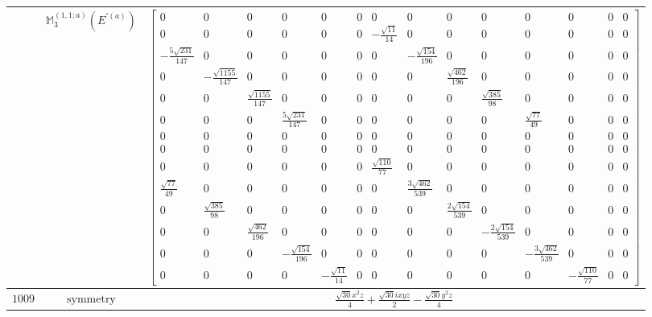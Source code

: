 \documentclass[fleqn,8pt,landscape]{jsarticle}
\begin{document}
\begin{longtable}{ccc}
$  $ & $ \mathbb{M}_{3}^{(1,1;a)}(E^{\prime(a)}) $ & $ \begin{bmatrix} 0 & 0 & 0 & 0 & 0 & 0 & 0 & 0 & 0 & 0 & 0 & 0 & 0 & 0 \\ 0 & 0 & 0 & 0 & 0 & 0 & - \frac{\sqrt{11}}{14} & 0 & 0 & 0 & 0 & 0 & 0 & 0 \\ - \frac{5 \sqrt{231}}{147} & 0 & 0 & 0 & 0 & 0 & 0 & - \frac{\sqrt{154}}{196} & 0 & 0 & 0 & 0 & 0 & 0 \\ 0 & - \frac{\sqrt{1155}}{147} & 0 & 0 & 0 & 0 & 0 & 0 & \frac{\sqrt{462}}{196} & 0 & 0 & 0 & 0 & 0 \\ 0 & 0 & \frac{\sqrt{1155}}{147} & 0 & 0 & 0 & 0 & 0 & 0 & \frac{\sqrt{385}}{98} & 0 & 0 & 0 & 0 \\ 0 & 0 & 0 & \frac{5 \sqrt{231}}{147} & 0 & 0 & 0 & 0 & 0 & 0 & \frac{\sqrt{77}}{49} & 0 & 0 & 0 \\ 0 & 0 & 0 & 0 & 0 & 0 & 0 & 0 & 0 & 0 & 0 & 0 & 0 & 0 \\ 0 & 0 & 0 & 0 & 0 & 0 & 0 & 0 & 0 & 0 & 0 & 0 & 0 & 0 \\ 0 & 0 & 0 & 0 & 0 & 0 & \frac{\sqrt{110}}{77} & 0 & 0 & 0 & 0 & 0 & 0 & 0 \\ \frac{\sqrt{77}}{49} & 0 & 0 & 0 & 0 & 0 & 0 & \frac{3 \sqrt{462}}{539} & 0 & 0 & 0 & 0 & 0 & 0 \\ 0 & \frac{\sqrt{385}}{98} & 0 & 0 & 0 & 0 & 0 & 0 & \frac{2 \sqrt{154}}{539} & 0 & 0 & 0 & 0 & 0 \\ 0 & 0 & \frac{\sqrt{462}}{196} & 0 & 0 & 0 & 0 & 0 & 0 & - \frac{2 \sqrt{154}}{539} & 0 & 0 & 0 & 0 \\ 0 & 0 & 0 & - \frac{\sqrt{154}}{196} & 0 & 0 & 0 & 0 & 0 & 0 & - \frac{3 \sqrt{462}}{539} & 0 & 0 & 0 \\ 0 & 0 & 0 & 0 & - \frac{\sqrt{11}}{14} & 0 & 0 & 0 & 0 & 0 & 0 & - \frac{\sqrt{110}}{77} & 0 & 0 \end{bmatrix} $ \\ \hline
$ 1009 $ & $ \text{symmetry} $ & $ \frac{\sqrt{30} x^{2} z}{4} + \frac{\sqrt{30} i x y z}{2} - \frac{\sqrt{30} y^{2} z}{4} $ \\

\end{longtable}
\end{document}
